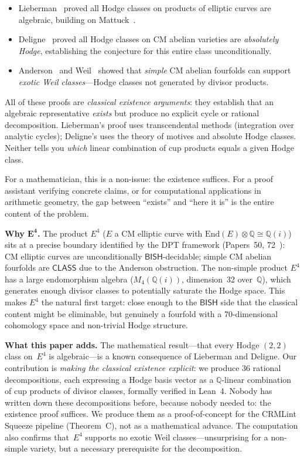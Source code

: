 \documentclass[11pt]{article}
\theoremstyle{plain}
\theoremstyle{definition}
\theoremstyle{remark}
\newcommand{\Q}{\mathbb{Q}}
\newcommand{\End}{\mathrm{End}}
\newcommand{\BISH}{\mathsf{BISH}}
\newcommand{\CLASS}{\mathsf{CLASS}}
\begin{document}
\begin{itemize}[nosep]
\item Lieberman~\cite{Lieberman1968} proved all Hodge classes on
  products of elliptic curves are algebraic, building on
  Mattuck~\cite{Mattuck1958}.
\item Deligne~\cite{Deligne1982} proved all Hodge classes on CM
  abelian varieties are \emph{absolutely Hodge}, establishing the
  conjecture for this entire class unconditionally.
\item Anderson~\cite{Anderson1993} and Weil~\cite{Weil1977} showed
  that \emph{simple} CM abelian fourfolds can support \emph{exotic
  Weil classes}---Hodge classes not generated by divisor products.
\end{itemize}

\noindent
All of these proofs are \emph{classical existence arguments}: they
establish that an algebraic representative \emph{exists} but
produce no explicit cycle or rational decomposition.
Lieberman's proof uses transcendental methods (integration over
analytic cycles); Deligne's uses the theory of motives and
absolute Hodge classes.  Neither tells you \emph{which} linear
combination of cup products equals a given Hodge class.

For a mathematician, this is a non-issue: the
existence suffices.  For a proof assistant verifying concrete
claims, or for computational applications in arithmetic geometry,
the gap between ``exists'' and ``here it is'' is the entire content
of the problem.

\medskip\noindent
\textbf{Why $\boldsymbol{E^4}$.}
The product $E^4$ ($E$ a CM elliptic curve with
$\End(E) \otimes \Q \cong \Q(i)$) sits at a precise boundary
identified by the DPT framework (Papers~50,
72~\cite{Paper50,Paper72}): CM elliptic curves are
unconditionally $\BISH$-decidable; simple CM abelian fourfolds
are $\CLASS$ due to the Anderson obstruction.  The non-simple
product $E^4$ has a large endomorphism algebra
($M_4(\Q(i))$, dimension~32 over~$\Q$), which generates
enough divisor classes to potentially saturate the Hodge space.
This makes $E^4$ the natural first target: close enough to the
$\BISH$ side that the classical content might be eliminable, but
genuinely a fourfold with a 70-dimensional cohomology space and
non-trivial Hodge structure.

\medskip\noindent
\textbf{What this paper adds.}
The mathematical result---that every Hodge $(2,2)$ class on~$E^4$
is algebraic---is a known consequence of Lieberman and Deligne.
Our contribution is \emph{making the classical existence explicit}:
we produce 36 rational decompositions, each expressing a Hodge
basis vector as a $\Q$-linear combination of cup products of
divisor classes, formally verified in Lean~4.  Nobody has written
down these decompositions before, because nobody needed to: the
existence proof suffices.  We produce them as a proof-of-concept
for the CRMLint Squeeze pipeline (Theorem~C), not as a
mathematical advance.  The computation also confirms that~$E^4$
supports no exotic Weil classes---unsurprising for a non-simple
variety, but a necessary prerequisite for the decomposition.
\end{document}

